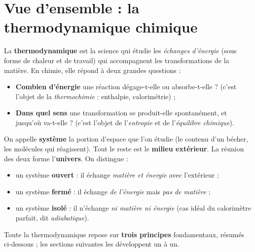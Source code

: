 \documentclass[11pt,a4paper]{article}
\begin{document}
\section{Vue d'ensemble : la thermodynamique chimique}
La \textbf{thermodynamique} est la science qui étudie les \emph{échanges d'énergie} (sous forme de
chaleur et de travail) qui accompagnent les transformations de la matière. En chimie, elle répond à
deux grandes questions :
\begin{itemize}[leftmargin=1.6em,topsep=2pt,itemsep=2pt]
  \item \textbf{Combien d'énergie} une réaction dégage-t-elle ou absorbe-t-elle ? (c'est l'objet de la
        \emph{thermochimie} : enthalpie, calorimétrie) ;
  \item \textbf{Dans quel sens} une transformation se produit-elle spontanément, et jusqu'où va-t-elle ?
        (c'est l'objet de l'\emph{entropie} et de l'\emph{équilibre chimique}).
\end{itemize}

\begin{definition}
On appelle \textbf{système} la portion d'espace que l'on étudie (le contenu d'un bécher, les molécules
qui réagissent). Tout le reste est le \textbf{milieu extérieur}. La réunion des deux forme l'\textbf{univers}.
On distingue :
\begin{itemize}[leftmargin=1.6em,topsep=2pt,itemsep=1.5pt]
  \item un système \textbf{ouvert} : il échange \emph{matière et énergie} avec l'extérieur ;
  \item un système \textbf{fermé} : il échange \emph{de l'énergie} mais \emph{pas de matière} ;
  \item un système \textbf{isolé} : il n'échange \emph{ni matière ni énergie} (cas idéal du calorimètre
        parfait, dit \emph{adiabatique}).
\end{itemize}
\end{definition}

Toute la thermodynamique repose sur \textbf{trois principes} fondamentaux, résumés ci-dessous ; les
sections suivantes les développent un à un.
\end{document}
